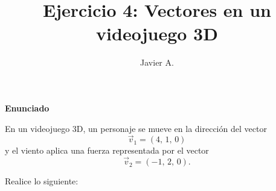 \documentclass{article}
\title{\Large \textbf{Ejercicio 4: Vectores en un videojuego 3D}}
\author{Javier A.}
\date{}
\begin{document}
\maketitle

\begin{center}
\colorbox{gray!10}{\parbox{0.95\textwidth}{
\vspace{0.3cm}
\centering
\textbf{\large Enunciado}
\vspace{0.2cm}

\begin{minipage}{0.9\textwidth}
En un videojuego 3D, un personaje se mueve en la dirección del vector
\[ \vec v_1 = (4,\,1,\,0) \]
y el viento aplica una fuerza representada por el vector
\[ \vec v_2 = (-1,\,2,\,0). \]
\end{minipage}
\vspace{0.3cm}
}}
\end{center}

\vspace{0.5em}
\noindent Realice lo siguiente:
\end{document}
